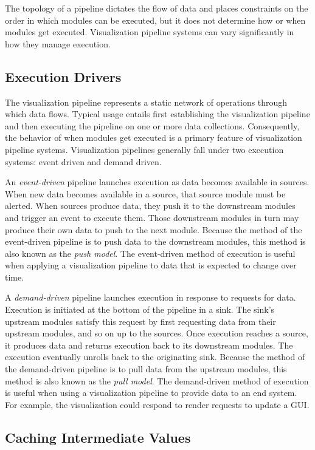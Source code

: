 \documentclass[journal,onecolumn,12pt,letterpaper,twoside]{IEEEtran}
\newcommand*{\keyterm}[1]{\emph{#1}}
\begin{document}
The topology of a pipeline dictates the flow of data and places constraints
on the order in which modules can be executed, but it does not determine
how or when modules get executed.  Visualization pipeline systems can
vary significantly in how they manage execution.

\subsection{Execution Drivers}
\label{sec:ExecutionDrivers}

The visualization pipeline represents a static network of operations
through which data flows.  Typical usage entails first establishing the
visualization pipeline and then executing the pipeline on one or more data
collections.  Consequently, the behavior of when modules get executed is
a primary feature of visualization pipeline systems.  Visualization
pipelines generally fall under two execution systems: event driven and
demand driven.

An \keyterm{event-driven} pipeline launches execution as data becomes
available in sources.  When new data becomes available in a source, that
source module must be alerted.  When sources produce data, they push it
to the downstream modules and trigger an event to execute them.  Those
downstream modules in turn may produce their own data to push to the
next module.  Because the method of the event-driven pipeline is to push
data to the downstream modules, this method is also known as the
\keyterm{push model}.  The event-driven method of execution is useful when
applying a visualization pipeline to data that is expected to change over
time.

A \keyterm{demand-driven} pipeline launches execution in response to
requests for data.  Execution is initiated at the bottom of the pipeline in
a sink.  The sink's upstream modules satisfy this request by first
requesting data from their upstream modules, and so on up to the
sources.  Once execution reaches a source, it produces data and returns
execution back to its downstream modules.  The execution eventually
unrolls back to the originating sink.  Because the method of the
demand-driven pipeline is to pull data from the upstream modules, this
method is also known as the \keyterm{pull model}.  The demand-driven method
of execution is useful when using a visualization pipeline to provide data
to an end system.  For example, the visualization could respond to render
requests to update a GUI.

\subsection{Caching Intermediate Values}
\label{sec:Caching}
\end{document}
